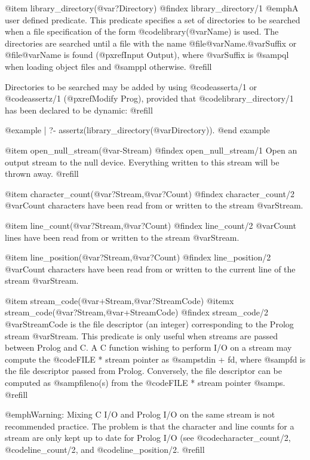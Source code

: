 @item library_directory(@var{?Directory})
@findex library_directory/1
@emph{A user defined predicate.}  This predicate specifies a set of
directories to be searched when a file specification of the form
@code{library(@var{Name})} is used.  The directories are searched until
a file with the name @file{@var{Name}.@var{Suffix}} or @file{@var{Name}}
is found (@pxref{Input Output}), where @var{Suffix} is @samp{ql} when
loading object files and @samp{pl} otherwise. @refill

Directories to be searched may be added by using @code{asserta/1} or
@code{assertz/1} (@pxref{Modify Prog}), provided that
@code{library_directory/1} has been declared to be dynamic: @refill

@example
| ?- assertz(library_directory(@var{Directory})).
@end example

@item open_null_stream(@var{-Stream})
@findex open_null_stream/1
Open an output stream to the null device.  Everything written to this stream
will be thrown away. @refill

@item character_count(@var{?Stream},@var{?Count})
@findex character_count/2
@var{Count} characters have been read from or written to the stream
@var{Stream}.

@item line_count(@var{?Stream},@var{?Count})
@findex line_count/2
@var{Count} lines have been read from or written to the stream
@var{Stream}.

@item line_position(@var{?Stream},@var{?Count})
@findex line_position/2
@var{Count} characters have been read from or written to the current
line of the stream @var{Stream}.

@item stream_code(@var{+Stream},@var{?StreamCode})
@itemx stream_code(@var{?Stream},@var{+StreamCode})
@findex stream_code/2
@var{StreamCode} is the file descriptor (an integer) corresponding to
the Prolog stream @var{Stream}.  This predicate is only useful when
streams are passed between Prolog and C.  A C function wishing to
perform I/O on a stream may compute the @code{FILE *} stream pointer as
@samp{stdin + fd}, where @samp{fd} is the file descriptor passed from
Prolog.  Conversely, the file descriptor can be computed as
@samp{fileno(s)} from the @code{FILE *} stream pointer @samp{s}. @refill

@emph{Warning:} Mixing C I/O and Prolog I/O on the same stream is not
recommended practice.  The problem is that the character and line counts
for a stream are only kept up to date for Prolog I/O (see
@code{character_count/2}, @code{line_count/2}, and
@code{line_position/2}. @refill

